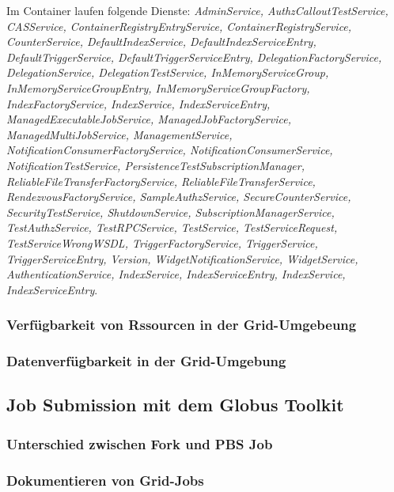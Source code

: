 	Im Container laufen folgende Dienste:
	\textsl{AdminService,
		AuthzCalloutTestService,
		CASService,
		ContainerRegistryEntryService,
		ContainerRegistryService,
		CounterService,
		DefaultIndexService,
		DefaultIndexServiceEntry,
		DefaultTriggerService,
		DefaultTriggerServiceEntry,
		DelegationFactoryService,
		DelegationService,
		DelegationTestService,
		InMemoryServiceGroup,
		InMemoryServiceGroupEntry,
		InMemoryServiceGroupFactory,
		IndexFactoryService,
		IndexService,
		IndexServiceEntry,
		ManagedExecutableJobService,
		ManagedJobFactoryService,
		ManagedMultiJobService,
		ManagementService,
		NotificationConsumerFactoryService,
		NotificationConsumerService,
		NotificationTestService,
		PersistenceTestSubscriptionManager,
		ReliableFileTransferFactoryService,
		ReliableFileTransferService,
		RendezvousFactoryService,
		SampleAuthzService,
		SecureCounterService,
		SecurityTestService,
		ShutdownService,
		SubscriptionManagerService,
		TestAuthzService,
		TestRPCService,
		TestService,
		TestServiceRequest,
		TestServiceWrongWSDL,
		TriggerFactoryService,
		TriggerService,
		TriggerServiceEntry,
		Version,
		WidgetNotificationService,
		WidgetService,
		AuthenticationService,
		IndexService,
		IndexServiceEntry,
		IndexService,
		IndexServiceEntry}.

	\subsubsection{Verfügbarkeit von Rssourcen in der Grid-Umgebeung}
	\subsubsection{Datenverfügbarkeit in der Grid-Umgebung}

\subsection{Job Submission mit dem Globus Toolkit}
	\subsubsection{Unterschied zwischen Fork und PBS Job}
	\subsubsection{Dokumentieren von Grid-Jobs}

